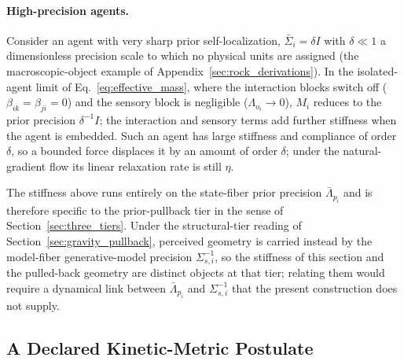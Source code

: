 \paragraph{High-precision agents.} Consider an agent with very sharp prior self-localization, $\bar{\Sigma}_i = \delta I$ with $\delta \ll 1$ a dimensionless precision scale to which no physical units are assigned (the macroscopic-object example of Appendix~\ref{sec:rock_derivations}). In the isolated-agent limit of Eq.~\eqref{eq:effective_mass}, where the interaction blocks switch off ($\beta_{ik} = \beta_{ji} = 0$) and the sensory block is negligible ($\Lambda_{o_i} \to 0$), $M_i$ reduces to the prior precision $\delta^{-1}I$; the interaction and sensory terms add further stiffness when the agent is embedded. Such an agent has large stiffness and compliance of order $\delta$, so a bounded force displaces it by an amount of order $\delta$; under the natural-gradient flow its linear relaxation rate is still $\eta$.

The stiffness above runs entirely on the state-fiber prior precision $\bar{\Lambda}_{p_i}$ and is therefore specific to the prior-pullback tier in the sense of Section~\ref{sec:three_tiers}. Under the structural-tier reading of Section~\ref{sec:gravity_pullback}, perceived geometry is carried instead by the model-fiber generative-model precision $\Sigma_{s,i}^{-1}$, so the stiffness of this section and the pulled-back geometry are distinct objects at that tier; relating them would require a dynamical link between $\bar{\Lambda}_{p_i}$ and $\Sigma_{s,i}^{-1}$ that the present construction does not supply.

\subsection{A Declared Kinetic-Metric Postulate}
\label{sec:velocity_quadratic}

